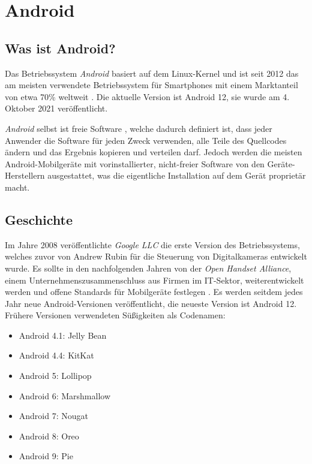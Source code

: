 \section{Android}
\label{androiddev}

\subsection{Was ist Android?}
Das Betriebssystem \textit{Android} basiert auf dem Linux-Kernel und ist seit 2012 das am meisten
verwendete Betriebssystem für Smartphones mit einem Marktanteil von etwa 70\% weltweit
\cite{mobileOsMarketShare}. Die aktuelle Version ist Android 12, sie wurde am 4. Oktober 2021
veröffentlicht.

\textit{Android} selbst ist freie Software \cite{androidOpenSourceProject}, welche dadurch definiert
ist, dass jeder Anwender die Software für jeden Zweck verwenden, alle Teile des Quellcodes
ändern und das Ergebnis kopieren und verteilen darf. Jedoch werden die meisten Android-Mobilgeräte
mit vorinstallierter, nicht-freier Software von den Geräte-Herstellern ausgestattet, was die
eigentliche Installation auf dem Gerät proprietär macht.

\subsection{Geschichte}
Im Jahre 2008 veröffentlichte \textit{Google LLC} die erste Version des Betriebssystems, welches
zuvor von Andrew Rubin für die Steuerung von Digitalkameras entwickelt wurde. Es sollte in den
nachfolgenden Jahren von der \textit{Open Handset Alliance}, einem Unternehmenszusammenschluss
aus Firmen im IT-Sektor, weiterentwickelt werden und offene Standards für Mobilgeräte festlegen
\cite{androidHistory}. Es werden seitdem jedes Jahr neue Android-Versionen veröffentlicht, die
neueste Version ist Android 12. Frühere Versionen verwendeten Süßigkeiten als Codenamen:

\begin{itemize}
  \item Android 4.1: Jelly Bean
  \item Android 4.4: KitKat
  \item Android 5: Lollipop
  \item Android 6: Marshmallow
  \item Android 7: Nougat
  \item Android 8: Oreo
  \item Android 9: Pie
\end{itemize}

